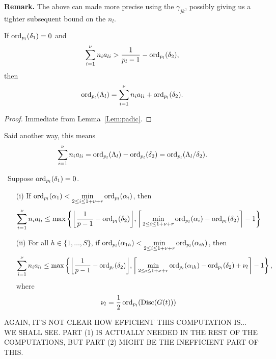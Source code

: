 \textbf{Remark.} The above can made more precise using the $\gamma_{jk}$, possibly giving us a tighter subsequent bound on the $n_l$. 

\begin{lemma} \label{Lem:Lambda}
If $\operatorname{ord}_{p_l}(\delta_1) = 0$ and 
\[\sum_{i = 1}^{\nu} n_{i}a_{li} > \frac{1}{p_l-1} - \operatorname{ord}_{p_l}(\delta_2),\]
then
\[\operatorname{ord}_{p_l}(\Lambda_l) = \sum_{i = 1}^{\nu} n_{i}a_{li} + \operatorname{ord}_{p_l}(\delta_2).\]
\end{lemma}

\begin{proof}
Immediate from Lemma~\ref{Lem:padic}.
\end{proof}
Said another way, this means
\[ \sum_{i = 1}^{\nu} n_{i}a_{li} = \operatorname{ord}_{p_l}(\Lambda_l) - \operatorname{ord}_{p_l}(\delta_2) =  \operatorname{ord}_{p_l}(\Lambda_l/\delta_2).\]

\begin{lemma} \label{Lem:specialcase} \
Suppose $\operatorname{ord}_{p_l}(\delta_1) = 0$. 
\begin{enumerate}
\item[(i)] If $\operatorname{ord}_{p_l}(\alpha_1) < \displaystyle \min_{2 \leq i \leq 1 + \nu + r} \operatorname{ord}_{p_l}(\alpha_i)$, then
\[\sum_{i = 1}^{\nu} n_i a_{li} \leq \max \left\{ \bigg\lfloor{\frac{1}{p-1} - \operatorname{ord}_{p_l}(\delta_2)}\bigg\rfloor,  \bigg \lceil\displaystyle \min_{2 \leq i \leq 1 + \nu + r} \operatorname{ord}_{p_l}(\alpha_{i}) - \operatorname{ord}_{p_l}(\delta_2) \bigg \rceil - 1 \right\}\]

\item[(ii)] For all $h \in \{1, \dots, S\}$, if $\operatorname{ord}_{p_l}(\alpha_{1h}) < \displaystyle \min_{2 \leq i \leq 1+ \nu + r} \operatorname{ord}_{p_l}(\alpha_{ih})$, then
\[\sum_{i = 1}^{\nu} n_i a_{li} \leq \max \left\{ \bigg\lfloor{\frac{1}{p-1} - \operatorname{ord}_{p_l}(\delta_2)}\bigg\rfloor, \bigg \lceil \displaystyle \min_{2 \leq i \leq 1+\nu+r} \operatorname{ord}_{p_l}(\alpha_{ih})- \operatorname{ord}_{p_l}(\delta_2) + \nu_l \bigg \rceil - 1\right\},\]
where 
\[\nu_l = \frac{1}{2}\operatorname{ord}_{p_l}(\text{Disc}(G(t)))\]
\end{enumerate}
\end{lemma}

AGAIN, IT'S NOT CLEAR HOW EFFICIENT THIS COMPUTATION IS... WE SHALL SEE. PART (1) IS ACTUALLY NEEDED IN THE REST OF THE COMPUTATIONS, BUT PART (2) MIGHT BE THE INEFFICIENT PART OF THIS. 

